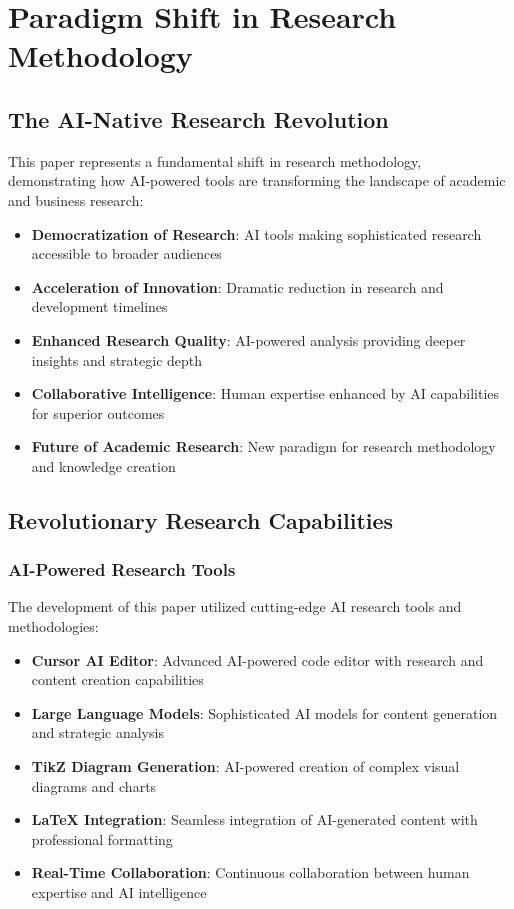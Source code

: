 \documentclass[12pt,a4paper]{book}
\begin{document}
\section{Paradigm Shift in Research Methodology}

\subsection{The AI-Native Research Revolution}

This paper represents a fundamental shift in research methodology, demonstrating how AI-powered tools are transforming the landscape of academic and business research:

\begin{itemize}
    \item \textbf{Democratization of Research}: AI tools making sophisticated research accessible to broader audiences
    \item \textbf{Acceleration of Innovation}: Dramatic reduction in research and development timelines
    \item \textbf{Enhanced Research Quality}: AI-powered analysis providing deeper insights and strategic depth
    \item \textbf{Collaborative Intelligence}: Human expertise enhanced by AI capabilities for superior outcomes
    \item \textbf{Future of Academic Research}: New paradigm for research methodology and knowledge creation
\end{itemize}

\subsection{Revolutionary Research Capabilities}

\subsubsection{AI-Powered Research Tools}

The development of this paper utilized cutting-edge AI research tools and methodologies:

\begin{itemize}
    \item \textbf{Cursor AI Editor}: Advanced AI-powered code editor with research and content creation capabilities
    \item \textbf{Large Language Models}: Sophisticated AI models for content generation and strategic analysis
    \item \textbf{TikZ Diagram Generation}: AI-powered creation of complex visual diagrams and charts
    \item \textbf{LaTeX Integration}: Seamless integration of AI-generated content with professional formatting
    \item \textbf{Real-Time Collaboration}: Continuous collaboration between human expertise and AI intelligence
\end{itemize}
\end{document}
